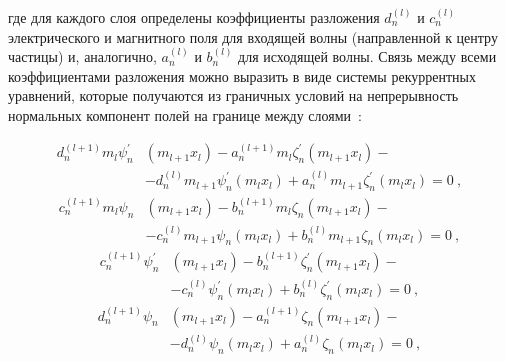 где для каждого слоя определены коэффициенты разложения $d_n^{(l)}$ и
$c_n^{(l)}$ электрического и магнитного поля для входящей волны
(направленной к центру частицы) и, аналогично, $a_n^{(l)}$ и
$b_n^{(l)}$ для исходящей волны.  Связь между всеми коэффициентами
разложения можно выразить в виде системы рекуррентных уравнений,
которые получаются из граничных условий на непрерывность
нормальных компонент полей на границе между слоями~\cite{Yang-2003}:

\begin{equation} %
  \label{eq:A2d1}
    \begin{alignedat}{2}
d^{(l+1)}_{n}m_{l} \psi^{\prime}_{n}&{\left (m_{l+1} x_{l} \right )}
- a^{(l+1)}_{n} m_{l} \zeta^{\prime}_{n}{\left (m_{l+1} x_{l} \right )}-\\
& - d^{(l)}_{n} m_{l+1} \psi^{\prime}_{n}{\left (m_{l} x_{l} \right )} 
+ a^{(l)}_{n} m_{l+1} \zeta^{\prime}_{n}{\left (m_{l} x_{l} \right )}
= 0\:,
\end{alignedat}
\end{equation}
\begin{equation} %
  \label{eq:A2d2}
\begin{alignedat}{2}
c^{(l+1)}_{n} m_{l} \psi_{n}&{\left (m_{l+1} x_{l} \right )}
  - b^{(l+1)}_{n} m_{l} \zeta_{n}{\left (m_{l+1} x_{l} \right )}-\\
&- c^{(l)}_{n} m_{l+1} \psi_{n}{\left (m_{l} x_{l} \right )} 
+b^{(l)}_{n} m_{l+1} \zeta_{n}{\left (m_{l} x_{l} \right )}  =0\:,
\end{alignedat}
\end{equation}
\begin{equation} %
  \label{eq:A2d3}
\begin{alignedat}{2}
c^{(l+1)}_{n} \psi^{\prime}_{n}&{\left (m_{l+1} x_{l} \right )}
- b^{(l+1)}_{n} \zeta^{\prime}_{n}{\left (m_{l+1} x_{l} \right )}-\\
&- c^{(l)}_{n} \psi^{\prime}_{n}{\left (m_{l} x_{l} \right )} 
+b^{(l)}_{n} \zeta^{\prime}_{n}{\left (m_{l} x_{l} \right )}   =0\:,
\end{alignedat}
\end{equation}
\begin{equation} %
  \label{eq:A2d4}
\begin{alignedat}{2}
 d^{(l+1)}_{n} \psi_{n}&{\left (m_{l+1} x_{l} \right )}
- a^{(l+1)}_{n} \zeta_{n}{\left (m_{l+1} x_{l} \right )}-\\
& - d^{(l)}_{n} \psi_{n}{\left (m_{l} x_{l} \right )} 
+ a^{(l)}_{n} \zeta_{n}{\left (m_{l} x_{l} \right )}   =0\:,
\end{alignedat}
\end{equation}
